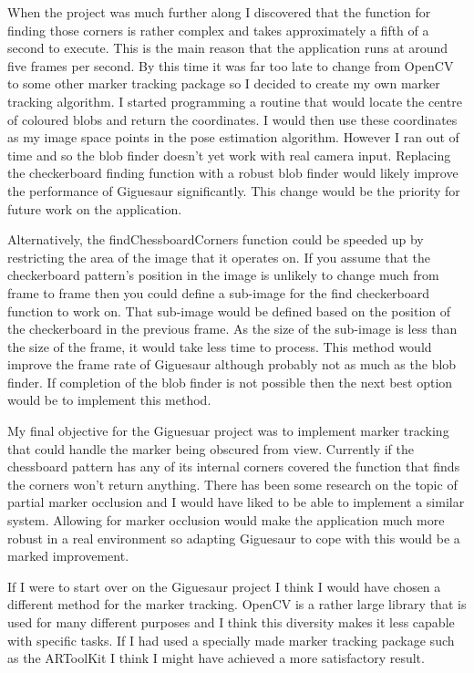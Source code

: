 \documentclass{article}
\begin{document}
When the project was much further along I discovered that the function for finding those corners is rather complex and takes approximately a fifth of a second to execute. This is the main reason that the application runs at around five frames per second. By this time it was far too late to change from OpenCV to some other marker tracking package so I decided to create my own marker tracking algorithm. I started programming a routine that would locate the centre of coloured blobs and return the coordinates. I would then use these coordinates as my image space points in the pose estimation algorithm. However I ran out of time and so the blob finder doesn't yet work with real camera input. Replacing the checkerboard finding function with a robust blob finder would likely improve the performance of Giguesaur significantly. This change would be the priority for future work on the application. 

Alternatively, the findChessboardCorners function could be speeded up by restricting the area of the image that it operates on. If you assume that the checkerboard pattern's position in the image is unlikely to change much from frame to frame then you could define a sub-image for the find checkerboard function to work on. That sub-image would be defined based on the position of the checkerboard in the previous frame. As the size of the sub-image is less than the size of the frame, it would take less time to process. This method would improve the frame rate of Giguesaur although probably not as much as the blob finder. If completion of the blob finder is not possible then the next best option would be to implement this method. 

My final objective for the Giguesuar project was to implement marker tracking that could handle the marker being obscured from view. Currently if the chessboard pattern has any of its internal corners covered the function that finds the corners won't return anything. There has been some research on the topic of partial marker occlusion \cite{occlusion} and I would have liked to be able to implement a similar system. Allowing for marker occlusion would make the application much more robust in a real environment so adapting Giguesaur to cope with this would be a marked improvement. 

If I were to start over on the Giguesaur project I think I would have chosen a different method for the marker tracking. OpenCV is a rather large library that is used for many different purposes and I think this diversity makes it less capable with specific tasks. If I had used a specially made marker tracking package such as the ARToolKit I think I might have achieved a more satisfactory result. 
\end{document}
